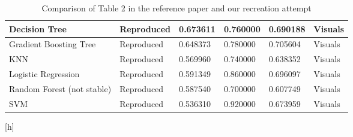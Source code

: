 \begin{table*}[h]
\begin{tabular}{|l|l|l|l|l|l|}
Decision Tree & Reproduced & 0.673611 & 0.760000 & 0.690188 & Visuals \\ \hline
Gradient Boosting Tree & Reproduced & 0.648373 & 0.780000 & 0.705604 & Visuals \\ \hline
KNN & Reproduced & 0.569960 & 0.740000 & 0.638352 & Visuals \\ \hline
Logistic Regression & Reproduced & 0.591349 & 0.860000 & 0.696097 & Visuals \\ \hline
Random Forest (not stable) & Reproduced & 0.587540 & 0.700000 & 0.607749 & Visuals \\ \hline
SVM & Reproduced & 0.536310 & 0.920000 & 0.673959 & Visuals \\ \hline

\end{tabular}
\caption{Comparison of Table 2 in the reference paper and our recreation attempt}
\label{table2}
\end{table*}[h]